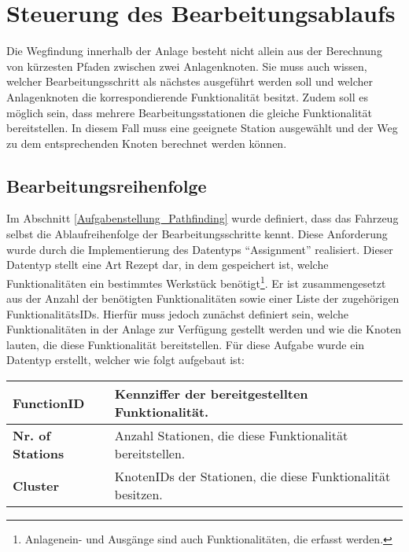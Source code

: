 	\section{Steuerung des Bearbeitungsablaufs}
		
		Die Wegfindung innerhalb der Anlage besteht nicht allein aus der Berechnung von kürzesten Pfaden zwischen zwei Anlagenknoten. Sie muss auch wissen, welcher Bearbeitungsschritt als nächstes ausgeführt werden soll und welcher Anlagenknoten die korrespondierende Funktionalität besitzt. Zudem soll es möglich sein, dass mehrere Bearbeitungsstationen die gleiche Funktionalität bereitstellen. In diesem Fall muss eine geeignete Station ausgewählt und der Weg zu dem entsprechenden Knoten berechnet werden können.
	
		\subsection{Bearbeitungsreihenfolge}
			\label{Bearbeitungsreihenfolge}
			Im Abschnitt \ref{Aufgabenstellung_Pathfinding} wurde definiert, dass das Fahrzeug selbst die Ablaufreihenfolge der Bearbeitungsschritte kennt. Diese Anforderung wurde durch die Implementierung des Datentyps "`Assignment"' realisiert. Dieser Datentyp stellt eine Art Rezept dar, in dem gespeichert ist, welche Funktionalitäten ein bestimmtes Werkstück benötigt\footnote{Anlagenein- und Ausgänge sind auch Funktionalitäten, die erfasst werden.}. Er ist zusammengesetzt aus der Anzahl der benötigten Funktionalitäten sowie einer Liste der zugehörigen FunktionalitätsIDs. Hierfür muss jedoch zunächst definiert sein, welche Funktionalitäten in der Anlage zur Verfügung gestellt werden und wie die Knoten lauten, die diese Funktionalität bereitstellen. Für diese Aufgabe wurde ein Datentyp erstellt, welcher wie folgt aufgebaut ist:
			
			\begin{longtable}{| l | l |}
				
				\hline
				\textbf{FunctionID} & Kennziffer der bereitgestellten Funktionalität.\\ \hline
				\textbf{Nr. of Stations} & Anzahl Stationen, die diese Funktionalität bereitstellen.\\ \hline
				\textbf{Cluster} & KnotenIDs der Stationen, die diese Funktionalität besitzen.\\
				\hline
				
			\end{longtable}
			
